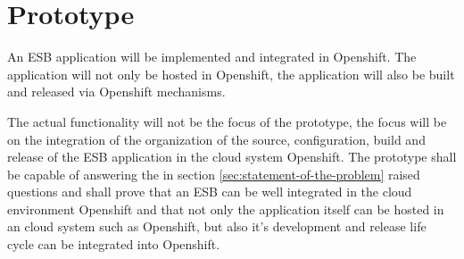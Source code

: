 \section{Prototype}
\label{sec:prototype}
An ESB application will be implemented and integrated in Openshift. The application will not only be hosted in Openshift, the application will also be built and released via Openshift mechanisms.

The actual functionality will not be the focus of the prototype, the focus will be on the integration of the organization of the source, configuration, build and release of the ESB application in the cloud system Openshift. The prototype shall be capable of answering the in section \ref{sec:statement-of-the-problem} raised questions and shall prove that an ESB can be well integrated in the cloud environment Openshift and that not only the application itself can be hosted in an cloud system such as Openshift, but also it's development and release life cycle can be integrated into Openshift.





 